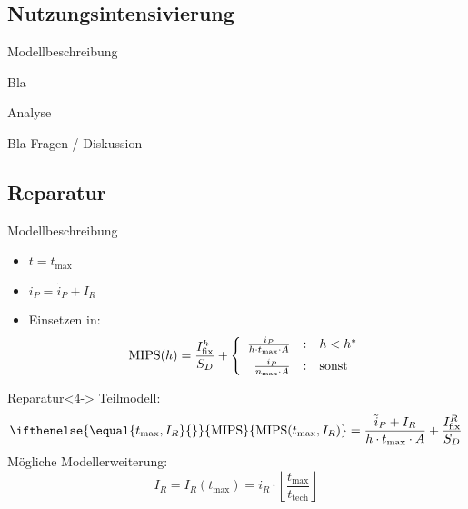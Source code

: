 \documentclass[beamer, xcolor=table]{beamer}
\newcommand{\MIPS}[1][]{
  \ifthenelse {\equal {#1} {}}
  {\text{MIPS}} %
  {\text{MIPS}({#1})} %
}
\newcommand{\I}[1]{I_\text{#1}}
\renewcommand{\t}[1]{t_\text{#1}}
\begin{document}
\subsection{Nutzungsintensivierung}
	\frame{\subsectionpage}
	\begin{frame}{Modellbeschreibung}
		\begin{center}
			Bla
		\end{center}
	\end{frame}
	
	\begin{frame}{Analyse}
		\begin{center}
			Bla
			Fragen / Diskussion
		\end{center}
	\end{frame}
	
\subsection{Reparatur}
\frame{\subsectionpage}
	\begin{frame}{Modellbeschreibung}
        \begin{itemize}
            \item<1-> $t = \t{max}$
            \item<2-> $i_P = \tilde{i}_P + I_R$
            \item<3-> Einsetzen in: 
                    \begin{equation*} 
                        \text{MIPS}(h) =
                        \frac{I_{\text{fix}}^h}{S_D} + \left\{ 
                            \begin{array}{r@{\quad : \quad}l}
                                \frac{i_P}{h \cdot t_{\text{max}} \cdot A}&
                                h < h^*  \\[5pt]
                                \frac{i_P}{n_{\text{max}} \cdot A}&  \text{sonst}
                            \end{array} 
                        \right.
                    \end{equation*}
        \end{itemize}
		\begin{center}
            \begin{block}{Reparatur}<4->
                Teilmodell:
                \begin{equation*}
                    \MIPS[\t{max}, I_R] = \frac{\tilde{i}_P + I_R}{h\cdot \t{max}\cdot A} 
                    + \frac{\I{fix}^R}{S_D}
                \end{equation*}
                Mögliche Modellerweiterung:
                \begin{equation*}
                    I_R = I_R(\t{max}) = i_R \cdot
                    \left\lfloor\frac{\t{max}}{\t{tech}}\right\rfloor
                \end{equation*}
            \end{block}
		\end{center}
	\end{frame}
	
\end{document}
